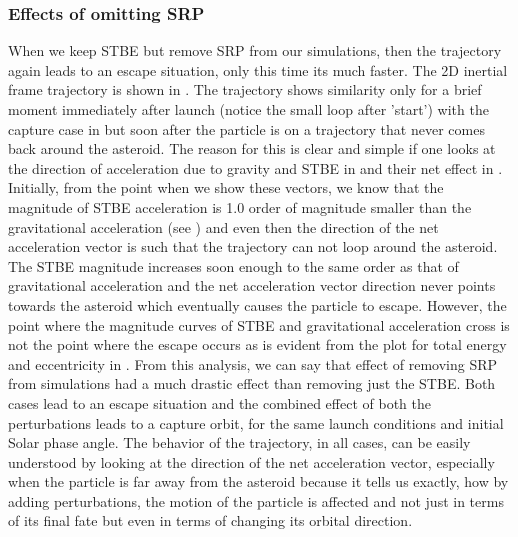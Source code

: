\subsubsection{Effects of omitting \gls{SRP}}
When we keep \gls{STBE} but remove \gls{SRP} from our simulations, then the trajectory again leads to an escape situation, only this time its much faster. The 2D inertial frame trajectory is shown in . The trajectory shows similarity only for a brief moment immediately after launch (notice the small loop after 'start') with the capture case in  but soon after the particle is on a trajectory that never comes back around the asteroid. The reason for this is clear and simple if one looks at the direction of acceleration due to gravity and \gls{STBE} in  and their net effect in . Initially, from the point when we show these vectors, we know that the magnitude of \gls{STBE} acceleration is 1.0 order of magnitude smaller than the gravitational acceleration (see ) and even then the direction of the net acceleration vector is such that the trajectory can not loop around the asteroid. The \gls{STBE} magnitude increases soon enough to the same order as that of gravitational acceleration and the net acceleration vector direction never points towards the asteroid which eventually causes the particle to escape. However, the point where the magnitude curves of \gls{STBE} and gravitational acceleration cross is not the point where the escape occurs as is evident from the plot for total energy and eccentricity in .
%
\newline\newline
%
From this analysis, we can say that effect of removing \gls{SRP} from simulations had a much drastic effect than removing just the \gls{STBE}. Both cases lead to an escape situation and the combined effect of both the perturbations leads to a capture orbit, for the same launch conditions and initial Solar phase angle. The behavior of the trajectory, in all cases, can be easily understood by looking at the direction of the net acceleration vector, especially when the particle is far away from the asteroid because it tells us exactly, how by adding perturbations, the motion of the particle is affected and not just in terms of its final fate but even in terms of changing its orbital direction.
